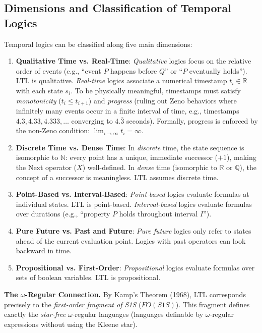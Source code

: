 \subsection{Dimensions and Classification of Temporal Logics}
Temporal logics can be classified along five main dimensions:
\begin{enumerate}
    \item \textbf{Qualitative Time vs. Real-Time}: 
          \emph{Qualitative} logics focus on the relative order of events (e.g., ``event $P$ happens before $Q$'' or ``$P$ eventually holds''). LTL is qualitative. \emph{Real-time} logics associate a numerical timestamp $t_i \in \mathbb{R}$ with each state $s_i$. To be physically meaningful, timestamps must satisfy \emph{monotonicity} ($t_i \le t_{i+1}$) and \emph{progress} (ruling out Zeno behaviors where infinitely many events occur in a finite interval of time, e.g., timestamps $4.3, 4.33, 4.333, \dots$ converging to $4.\overline{3}$ seconds). Formally, progress is enforced by the non-Zeno condition: $\lim_{i\to\infty} t_i = \infty$.
    \item \textbf{Discrete Time vs. Dense Time}:
          In \emph{discrete} time, the state sequence is isomorphic to $\mathbb{N}$: every point has a unique, immediate successor ($+1$), making the Next operator ($X$) well-defined. In \emph{dense} time (isomorphic to $\mathbb{R}$ or $\mathbb{Q}$), the concept of a successor is meaningless. LTL assumes discrete time.
    \item \textbf{Point-Based vs. Interval-Based}:
          \emph{Point-based} logics evaluate formulas at individual states. LTL is point-based. \emph{Interval-based} logics evaluate formulas over durations (e.g., ``property $P$ holds throughout interval $I$'').
    \item \textbf{Pure Future vs. Past and Future}:
          \emph{Pure future} logics only refer to states ahead of the current evaluation point. Logics with past operators can look backward in time.
    \item \textbf{Propositional vs. First-Order}:
          \emph{Propositional} logics evaluate formulas over sets of boolean variables. LTL is propositional.
\end{enumerate}

\medskip\noindent
\textbf{The $\omega$-Regular Connection.} 
By Kamp's Theorem (1968), LTL corresponds precisely to the \emph{first-order fragment of S1S} ($FO(S1S)$). This fragment defines exactly the \emph{star-free} $\omega$-regular languages (languages definable by $\omega$-regular expressions without using the Kleene star). 


